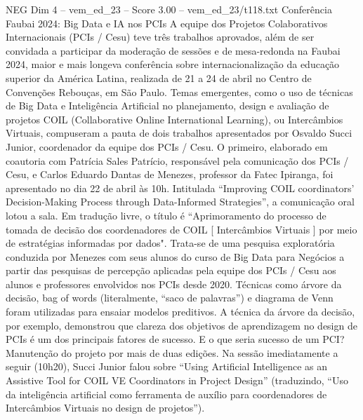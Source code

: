 \begin{textsample}{NEG Dim 4 – vem\_ed\_23 – Score 3.00 – vem\_ed\_23/t118.txt}  \label{ex:f4_neg_092}
Conferência Faubai 2024: Big Data e IA nos PCIs A equipe dos Projetos Colaborativos Internacionais (PCIs / Cesu) teve três trabalhos aprovados, além de ser convidada a participar da moderação de sessões e de mesa-redonda na Faubai 2024, maior e mais longeva conferência sobre internacionalização da educação superior da América Latina, realizada de 21 a 24 de abril no Centro de Convenções Rebouças, em São Paulo.
Temas emergentes, como o uso de técnicas de Big Data e Inteligência Artificial no planejamento, design e avaliação de projetos COIL (Collaborative Online International Learning), ou Intercâmbios Virtuais, compuseram a pauta de dois trabalhos apresentados por Osvaldo Succi Junior, coordenador da equipe dos PCIs / Cesu.
O primeiro, elaborado em coautoria com Patrícia Sales Patrício, responsável pela comunicação dos PCIs / Cesu, e Carlos Eduardo Dantas de Menezes, professor da Fatec Ipiranga, foi apresentado no dia 22 de abril às 10h.
Intitulada “Improving COIL coordinators’ Decision-Making Process through Data-Informed Strategies”, a comunicação oral lotou a sala.
Em tradução livre, o título é “Aprimoramento do processo de tomada de decisão dos coordenadores de COIL [ Intercâmbios Virtuais ] por meio de estratégias informadas por dados".
Trata-se de uma pesquisa exploratória conduzida por Menezes com seus alunos do curso de Big Data para Negócios a partir das pesquisas de percepção aplicadas pela equipe dos PCIs / Cesu aos alunos e professores envolvidos nos PCIs desde 2020.
Técnicas como árvore da decisão, bag of words (literalmente, “saco de palavras”) e diagrama de Venn foram utilizadas para ensaiar modelos preditivos.
A técnica da árvore da decisão, por exemplo, demonstrou que clareza dos objetivos de aprendizagem no design de PCIs é um dos principais fatores de sucesso.
E o que seria sucesso de um PCI?
Manutenção do projeto por mais de duas edições.
Na sessão imediatamente a seguir (10h20), Succi Junior falou sobre “Using Artificial Intelligence as an Assistive Tool for COIL VE Coordinators in Project Design” (traduzindo, “Uso da inteligência artificial como ferramenta de auxílio para coordenadores de Intercâmbios Virtuais no design de projetos”).

\end{textsample}
